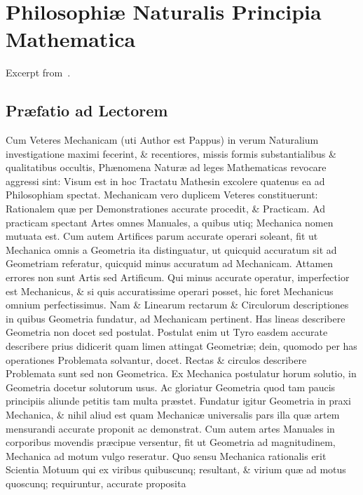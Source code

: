 \documentclass{ansarticle}
\begin{document}

\section{Philosophi\ae{} Naturalis Principia Mathematica}

Excerpt from~\cite{Newton1687}.

\subsection{Pr\ae{}fatio ad Lectorem}

Cum Veteres Mechanicam (uti Author est Pappus) in verum Naturalium
investigatione maximi fecerint, \& recentiores, missis formis
substantialibus \& qualitatibus occultis, Ph\ae{}nomena Natur\ae{} ad
leges Mathematicas revocare aggressi sint: Visum est in hoc Tractatu
Mathesin excolere quatenus ea ad Philosophiam spectat. Mechanicam vero
duplicem Veteres constituerunt: Rationalem qu\ae{} per Demonstrationes
accurate procedit, \& Practicam. Ad practicam spectant Artes omnes
Manuales, a quibus utiq; Mechanica nomen mutuata est. Cum autem
Artifices parum accurate operari soleant, fit ut Mechanica omnis a
Geometria ita distinguatur, ut quicquid accuratum sit ad Geometriam
referatur, quicquid minus accuratum ad Mechanicam. Attamen errores non
sunt Artis sed Artificum. Qui minus accurate operatur, imperfectior
est Mechanicus, \& si quis accuratissime operari posset, hic foret
Mechanicus omnium perfectissimus. Nam \& Linearum rectarum \&
Circulorum descriptiones in quibus Geometria fundatur, ad Mechanicam
pertinent. Has lineas describere Geometria non docet sed
postulat. Postulat enim ut Tyro easdem accurate describere prius
didicerit quam limen attingat Geometri\ae{}; dein, quomodo per has
operationes Problemata solvantur, docet. Rectas \& circulos describere
Problemata sunt sed non Geometrica. Ex Mechanica postulatur horum
solutio, in Geometria docetur solutorum usus. Ac gloriatur Geometria
quod tam paucis principiis aliunde petitis tam multa
pr\ae{}stet. Fundatur igitur Geometria in praxi Mechanica, \& nihil
aliud est quam Mechanic\ae{} universalis pars illa qu\ae{} artem
mensurandi accurate proponit ac demonstrat. Cum autem artes Manuales
in corporibus movendis pr\ae{}cipue versentur, fit ut Geometria ad
magnitudinem, Mechanica ad motum vulgo reseratur. Quo sensu Mechanica
rationalis erit Scientia Motuum qui ex viribus quibuscunq; resultant,
\& virium qu\ae{} ad motus quoscunq; requiruntur, accurate proposita
\end{document}
